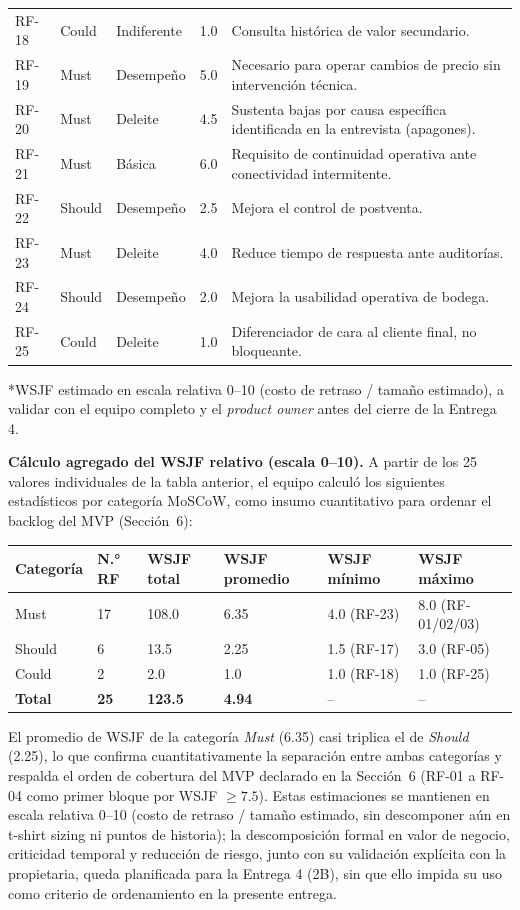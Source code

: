 \documentclass[11pt,a4paper]{article}
\begin{document}
\begin{longtable}{|p{1.3cm}|p{1.8cm}|p{2.2cm}|p{1.6cm}|p{7.5cm}|}
RF-18 & Could & Indiferente & 1.0 & Consulta histórica de valor secundario. \\
RF-19 & Must & Desempeño & 5.0 & Necesario para operar cambios de precio sin intervención técnica. \\
RF-20 & Must & Deleite & 4.5 & Sustenta bajas por causa específica identificada en la entrevista (apagones). \\
RF-21 & Must & Básica & 6.0 & Requisito de continuidad operativa ante conectividad intermitente. \\
RF-22 & Should & Desempeño & 2.5 & Mejora el control de postventa. \\
RF-23 & Must & Deleite & 4.0 & Reduce tiempo de respuesta ante auditorías. \\
RF-24 & Should & Desempeño & 2.0 & Mejora la usabilidad operativa de bodega. \\
RF-25 & Could & Deleite & 1.0 & Diferenciador de cara al cliente final, no bloqueante. \\
\hline
\end{longtable}
\footnotesize{*WSJF estimado en escala relativa 0--10 (costo de retraso / tamaño estimado), a validar con el equipo completo y el \textit{product owner} antes del cierre de la Entrega 4.}

\textbf{Cálculo agregado del WSJF relativo (escala 0--10).} A partir de los 25 valores individuales de la tabla anterior, el equipo calculó los siguientes estadísticos por categoría MoSCoW, como insumo cuantitativo para ordenar el backlog del MVP (Sección~6):

\begin{longtable}{|p{2.2cm}|p{1.6cm}|p{2.2cm}|p{2.2cm}|p{2.2cm}|p{2.2cm}|}
\hline
\textbf{Categoría} & \textbf{N.° RF} & \textbf{WSJF total} & \textbf{WSJF promedio} & \textbf{WSJF mínimo} & \textbf{WSJF máximo} \\
\hline
Must & 17 & 108.0 & 6.35 & 4.0 (RF-23) & 8.0 (RF-01/02/03) \\
\hline
Should & 6 & 13.5 & 2.25 & 1.5 (RF-17) & 3.0 (RF-05) \\
\hline
Could & 2 & 2.0 & 1.0 & 1.0 (RF-18) & 1.0 (RF-25) \\
\hline
\textbf{Total} & \textbf{25} & \textbf{123.5} & \textbf{4.94} & -- & -- \\
\hline
\end{longtable}

El promedio de WSJF de la categoría \textit{Must} (6.35) casi triplica el de \textit{Should} (2.25), lo que confirma cuantitativamente la separación entre ambas categorías y respalda el orden de cobertura del MVP declarado en la Sección~6 (RF-01 a RF-04 como primer bloque por WSJF $\geq 7.5$). Estas estimaciones se mantienen en escala relativa 0--10 (costo de retraso / tamaño estimado, sin descomponer aún en t-shirt sizing ni puntos de historia); la descomposición formal en valor de negocio, criticidad temporal y reducción de riesgo, junto con su validación explícita con la propietaria, queda planificada para la Entrega 4 (2B), sin que ello impida su uso como criterio de ordenamiento en la presente entrega.
\end{document}

